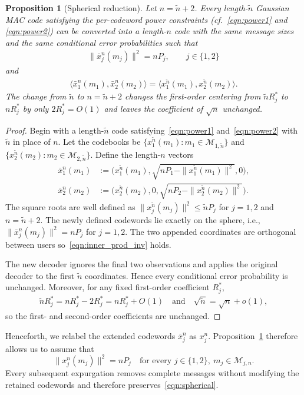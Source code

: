 \documentclass[11pt,onecolumn]{IEEEtran}
\newcommand{\calM}{\mathcal{M}}
\newcommand{\tiln}{\tilde{n}}
\newcommand{\barx}{\bar{x}}
\newtheorem{proposition}[theorem]{Proposition}
\begin{document}
\begin{proposition}[Spherical reduction] \label{prop:spherical}
Let $n = \tiln+2$. 
Every length-$\tiln$ Gaussian MAC code satisfying the
per-codeword power constraints (cf.\ \eqref{eqn:power1} and \eqref{eqn:power2}) can be converted into a length-$n$ code with the same message sizes and the same conditional error probabilities such that
\begin{align}
\|\barx_j^n(m_j)\|^2 = nP_j,\qquad j \in \{1,2\}
\end{align}
and 
\begin{align}
\langle\barx_1^n(m_1), \barx_2^n(m_2) \rangle=\langle x_1^{\tiln}(m_1), x_2^{\tiln}(m_2) \rangle. \label{eqn:inner_prod_inv}
\end{align}
The change from $\tiln$ to $n=\tiln+2$ changes the first-order
centering from $\tiln R_j^*$ to $nR_j^*$ by only $2R_j^*=O(1)$ and leaves
the coefficient of $\sqrt n$ unchanged.
\end{proposition}
\begin{proof}
Begin with a length-$\tiln$ code satisfying~\eqref{eqn:power1} and~\eqref{eqn:power2} with $\tiln$ in place of $n$. Let the codebooks be $\{  x_1^{\tiln}(m_1): m_1 \in\calM_{1,\tiln} \}$ and $\{  x_2^{\tiln}(m_2)  :m_2 \in\calM_{2,\tiln} \}$. Define  the length-$n$ vectors
\begin{align}
 \barx_1^n(m_1) & := \big( x_1^{\tiln}(m_1), \sqrt{nP_1-\|x_1^{\tiln}(m_1)\|^2},0\big),\\
  \barx_2^n(m_2) & := \big( x_2^{\tiln}(m_2), 0,\sqrt{nP_2-\|x_2^{\tiln}(m_2)\|^2} \big).
\end{align}
The square roots are well defined as $\|x_j^{\tiln}(m_j)\|^2 \le \tiln P_j$ for $j = 1,2$ and $n=\tiln+2$. The newly defined codewords lie exactly on the sphere, i.e., $\| \barx_j^n(m_j)\|^2 =nP_j$ for $j = 1,2$. The two appended coordinates are orthogonal between users so~\eqref{eqn:inner_prod_inv} holds.

The new decoder ignores the final two observations and applies the original decoder to the first $\tiln$ coordinates. Hence every conditional error probability is unchanged. Moreover, for any fixed first-order coefficient $R_j^*$, 
\begin{align}
\tiln R_j^* = nR_j^*-2R_j^*= nR_j^*+O(1)  \quad\mbox{and}\quad\sqrt{\tiln} = \sqrt{n}+o(1),
\end{align}
so the first- and second-order coefficients are unchanged.  
\end{proof}
Henceforth, we relabel the extended codewords $\barx_j^n$ as $x_j^n$.
Proposition~\ref{prop:spherical} therefore allows us to assume that 
\begin{equation}
\|x_j^n (m_j)\|^2 =n P_j\quad \mbox{for every  } j \in \{1,2\},~m_j\in\calM_{j,n}. \label{eqn:spherical}
\end{equation}
Every subsequent expurgation removes complete messages without
modifying the retained codewords and therefore preserves~\eqref{eqn:spherical}.
\end{document}

